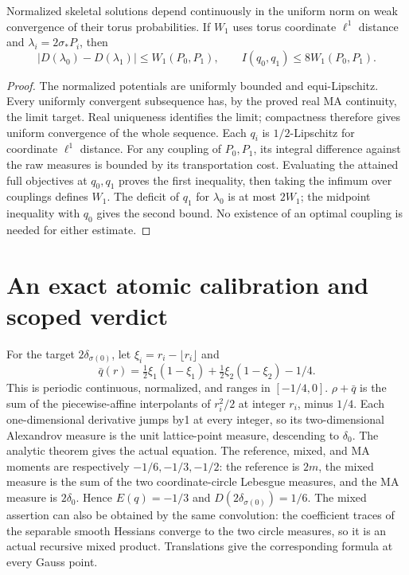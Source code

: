 \begin{proposition}\label{newrad:stability}
Normalized skeletal solutions depend continuously in the uniform norm
on weak convergence of their torus probabilities. If $W_1$ uses torus
coordinate $\ell^1$ distance and $\lambda_i=2\sigma_*P_i$, then
\[
 |D(\lambda_0)-D(\lambda_1)|\le W_1(P_0,P_1),\qquad
 I(q_0,q_1)\le8W_1(P_0,P_1).
\]
\end{proposition}
\begin{proof}
The normalized potentials are uniformly bounded and equi-Lipschitz.
Every uniformly convergent subsequence has, by the proved real MA
continuity, the limit target. Real uniqueness identifies the limit;
compactness therefore gives uniform convergence of the whole sequence.
Each $q_i$ is $1/2$-Lipschitz for coordinate $\ell^1$ distance.
For any coupling of $P_0,P_1$, its integral difference against the
raw measures is bounded by its transportation cost. Evaluating the
attained full objectives at $q_0,q_1$ proves the first inequality,
then taking the infimum over couplings defines $W_1$. The deficit of
$q_1$ for $\lambda_0$ is at most $2W_1$; the midpoint inequality
with $q_0$ gives the second bound. No existence of an optimal coupling
is needed for either estimate.
\end{proof}

\section{An exact atomic calibration and scoped verdict}
For the target $2\delta_{\sigma(0)}$, let
$\xi_i=r_i-\lfloor r_i\rfloor$ and
\[
 \bar q(r)=\tfrac12\xi_1(1-\xi_1)
             +\tfrac12\xi_2(1-\xi_2)-1/4.
\]
This is periodic continuous, normalized, and ranges in $[-1/4,0]$.
$\rho+\bar q$ is the sum of the piecewise-affine interpolants of
$r_i^2/2$ at integer $r_i$, minus $1/4$. Each one-dimensional
derivative jumps by1 at every integer, so its two-dimensional
Alexandrov measure is the unit lattice-point measure, descending to
$\delta_0$. The analytic theorem gives the actual equation.
The reference, mixed, and MA moments are respectively $-1/6,-1/3,-1/2$:
the reference is $2m$, the mixed measure is the sum of the two
coordinate-circle Lebesgue measures, and the MA measure is $2\delta_0$.
Hence $E(q)=-1/3$ and $D(2\delta_{\sigma(0)})=1/6$.
The mixed assertion can also be obtained by the same convolution:
the coefficient traces of the separable smooth Hessians converge to
the two circle measures, so it is an actual recursive mixed product.
Translations give the corresponding formula at every Gauss point.

